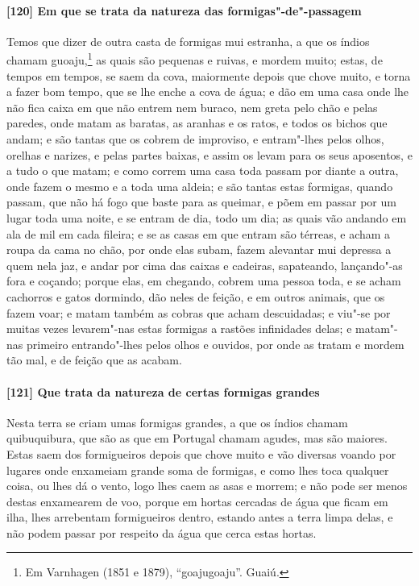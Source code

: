 \paragraph{[120] Em que se trata da natureza das formigas"-de"-passagem}\quad
Temos que dizer de outra casta de formigas mui estranha, a que os índios chamam
guoaju,\footnote{ Em Varnhagen (1851 e 1879), ``goajugoaju''. Guaiú.} as quais são
pequenas e ruivas, e mordem muito; estas, de tempos em tempos, se saem da cova, maiormente
depois que chove muito, e torna a fazer bom tempo, que se lhe enche a cova de água; e dão
em uma casa onde lhe não fica caixa em que não entrem nem buraco, nem greta pelo chão e
pelas paredes, onde matam as baratas, as aranhas e os ratos, e todos os bichos que andam;
e são tantas que os cobrem de improviso, e entram"-lhes pelos olhos, orelhas e narizes, e
pelas partes baixas, e assim os levam para os seus aposentos, e a tudo o que matam; e como
correm uma casa toda passam por diante a outra, onde fazem o mesmo e a toda uma aldeia; e
são tantas estas formigas, quando passam, que não há fogo que baste para as queimar, e
põem em passar por um lugar toda uma noite, e se entram de dia, todo um dia; as quais vão
andando em ala de mil em cada fileira; e se as casas em que entram são térreas, e acham a
roupa da cama no chão, por onde elas subam, fazem alevantar mui depressa a quem nela jaz,
e andar por cima das caixas e cadeiras, sapateando, lançando"-as fora e coçando; porque
elas, em chegando, cobrem uma pessoa toda, e se acham cachorros e gatos dormindo, dão
neles de feição, e em outros animais, que os fazem voar; e matam também as cobras que
acham descuidadas; e viu"-se por muitas vezes levarem"-nas estas formigas a rastões
infinidades delas; e matam"-nas primeiro entrando"-lhes pelos olhos e ouvidos, por onde as
tratam e mordem tão mal, e de feição que as acabam.

\paragraph{[121] Que trata da natureza de certas formigas grandes}\quad
Nesta terra se criam umas formigas grandes, a que os índios chamam quibuquibura, que são
as que em Portugal chamam agudes, mas são maiores. Estas saem dos formigueiros depois que
chove muito e vão diversas voando por lugares onde enxameiam grande soma de formigas, e
como lhes toca qualquer coisa, ou lhes dá o vento, logo lhes caem as asas e morrem; e não
pode ser menos destas enxamearem de voo, porque em hortas cercadas de água que ficam em
ilha, lhes arrebentam formigueiros dentro, estando antes a terra limpa delas, e não podem
passar por respeito da água que cerca estas hortas.

